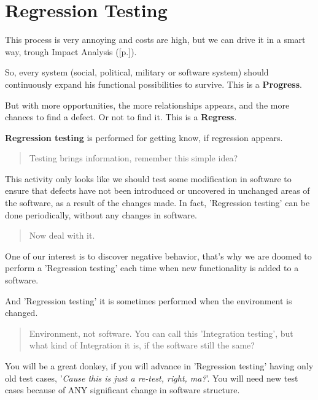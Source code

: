 \section{Regression Testing}
\label{sec:Regression Testing}

This process is very annoying and costs are high, but we can drive it in a smart way, trough Impact Analysis ([p.\pageref{sec:Impact Analysis}]).

So, every system (social, political, military or software system) should continuously expand his functional possibilities to survive. This is a \textbf{Progress}.

But with more opportunities, the more relationships appears, and the more chances to find a defect. Or not to find it. This is a \textbf{Regress}.

\textbf{Regression testing} is performed for getting know, if regression appears.

\begin{quote}
 Testing brings information, remember this simple idea?
 \end{quote} 

This activity only looks like we should test some modification in software to ensure that defects have not been introduced or uncovered in unchanged areas of the software, as a result of the changes made. In fact, 'Regression testing' can be done periodically, without any changes in software. 

\begin{quote}
Now deal with it.\end{quote} 

One of our interest is to discover negative behavior, that's why we are doomed to perform a 'Regression testing' each time when new functionality is added to a software.

And 'Regression testing' it is sometimes performed when the environment is changed.

\begin{quote}
 Environment, not software. You can call this 'Integration testing', but what kind of Integration it is, if the software still the same?
\end{quote} 

You will be a great donkey, if you will advance in 'Regression testing' having only old test cases, '\textit{Cause this is just a re-test, right, ma?}'. You will need new test cases because of ANY significant change in software structure.
